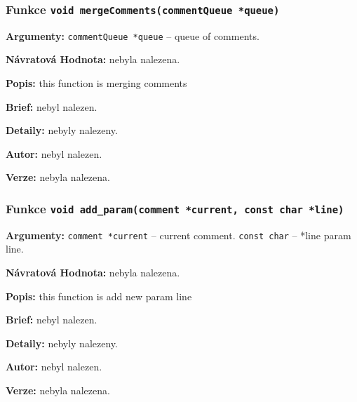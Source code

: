\documentclass[12pt, a4paper]{article}
\begin{document}
\subsubsection{Funkce \texttt{void mergeComments(commentQueue *queue)}}
\textbf{Argumenty: }\verb"commentQueue *queue" -- queue of comments. \\
\par\noindent
\textbf{Návratová Hodnota: }nebyla nalezena.\\
\par\noindent
\textbf{Popis: }this function is merging comments\\
\par\noindent
\textbf{Brief: }nebyl nalezen.\\
\par\noindent
\textbf{Detaily: }nebyly nalezeny.\\
\par\noindent
\textbf{Autor: }nebyl nalezen.\\
\par\noindent
\textbf{Verze: }nebyla nalezena.\\
\par\noindent
\subsubsection{Funkce \texttt{void add\_param(comment *current, const char *line)}}
\textbf{Argumenty: }\verb"comment *current" -- current comment. \verb"const char" -- *line param line. \\
\par\noindent
\textbf{Návratová Hodnota: }nebyla nalezena.\\
\par\noindent
\textbf{Popis: }this function is add new param line\\
\par\noindent
\textbf{Brief: }nebyl nalezen.\\
\par\noindent
\textbf{Detaily: }nebyly nalezeny.\\
\par\noindent
\textbf{Autor: }nebyl nalezen.\\
\par\noindent
\textbf{Verze: }nebyla nalezena.\\
\par\noindent
\end{document}

